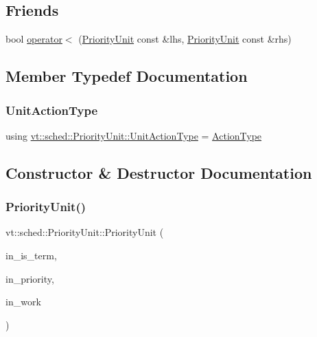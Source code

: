 \subsection*{Friends}
\begin{DoxyCompactItemize}
\item 
bool \hyperlink{structvt_1_1sched_1_1_priority_unit_acb3ebd4c059caed604579a0bbfb8b0e8}{operator$<$} (\hyperlink{structvt_1_1sched_1_1_priority_unit}{Priority\+Unit} const \&lhs, \hyperlink{structvt_1_1sched_1_1_priority_unit}{Priority\+Unit} const \&rhs)
\end{DoxyCompactItemize}


\subsection{Member Typedef Documentation}
\mbox{\label{structvt_1_1sched_1_1_priority_unit_aadc2c7160cb86f45260dbdd2d39b1b68}} 
\subsubsection{\texorpdfstring{Unit\+Action\+Type}{UnitActionType}}
{\footnotesize\ttfamily using \hyperlink{structvt_1_1sched_1_1_priority_unit_aadc2c7160cb86f45260dbdd2d39b1b68}{vt\+::sched\+::\+Priority\+Unit\+::\+Unit\+Action\+Type} =  \hyperlink{namespacevt_ae0a5a7b18cc99d7b732cb4d44f46b0f3}{Action\+Type}}



\subsection{Constructor \& Destructor Documentation}
\mbox{\label{structvt_1_1sched_1_1_priority_unit_ae0f822497e235515829b196c0a78d07f}} 
\subsubsection{\texorpdfstring{Priority\+Unit()}{PriorityUnit()}}
{\footnotesize\ttfamily vt\+::sched\+::\+Priority\+Unit\+::\+Priority\+Unit (\begin{DoxyParamCaption}\item[{bool}]{in\+\_\+is\+\_\+term,  }\item[{\hyperlink{namespacevt_a86bff9f556eb761b27fc8600d006ac04}{Priority\+Type}}]{in\+\_\+priority,  }\item[{\hyperlink{structvt_1_1sched_1_1_priority_unit_aadc2c7160cb86f45260dbdd2d39b1b68}{Unit\+Action\+Type}}]{in\+\_\+work }\end{DoxyParamCaption})\hspace{0.3cm}{\ttfamily [inline]}}



